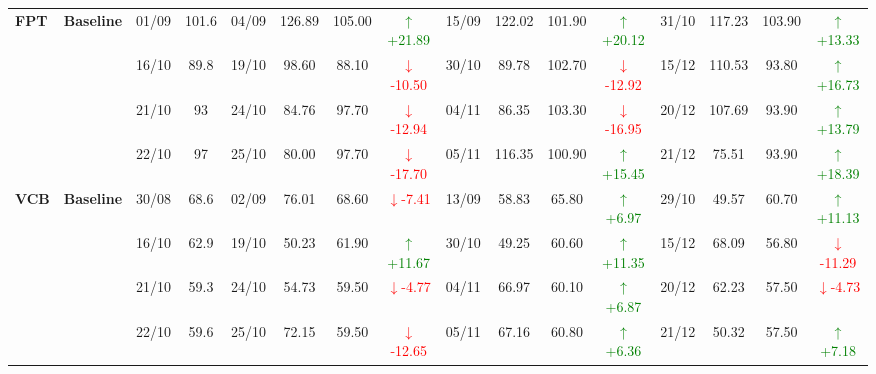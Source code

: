 {\begin{longtable}{llcc|cccc|cccc|cccc}
\multirow{4}{*}{\textbf{FPT}}
& \textbf{Baseline}
& 01/09 & 101.6 & 04/09 & 126.89 & 105.00 & \textcolor{green}{\(\uparrow\)+21.89} & 15/09 & 122.02 & 101.90 & \textcolor{green}{\(\uparrow\)+20.12} & 31/10 & 117.23 & 103.90 & \textcolor{green}{\(\uparrow\)+13.33} \\
& & 16/10 & 89.8 & 19/10 & 98.60 & 88.10 & \textcolor{red}{\(\downarrow\)-10.50} & 30/10 & 89.78 & 102.70 & \textcolor{red}{\(\downarrow\)-12.92} & 15/12 & 110.53 & 93.80 & \textcolor{green}{\(\uparrow\)+16.73} \\
& & 21/10 & 93 & 24/10 & 84.76 & 97.70 & \textcolor{red}{\(\downarrow\)-12.94} & 04/11 & 86.35 & 103.30 & \textcolor{red}{\(\downarrow\)-16.95} & 20/12 & 107.69 & 93.90 & \textcolor{green}{\(\uparrow\)+13.79} \\
& & 22/10 & 97 & 25/10 & 80.00 & 97.70 & \textcolor{red}{\(\downarrow\)-17.70} & 05/11 & 116.35 & 100.90 & \textcolor{green}{\(\uparrow\)+15.45} & 21/12 & 75.51 & 93.90 & \textcolor{green}{\(\uparrow\)+18.39} \\
\midrule

\multirow{4}{*}{\textbf{VCB}}
& \textbf{Baseline}
& 30/08 & 68.6 & 02/09 & 76.01 & 68.60 & \textcolor{red}{\(\downarrow\)-7.41} & 13/09 & 58.83 & 65.80 & \textcolor{green}{\(\uparrow\)+6.97} & 29/10 & 49.57 & 60.70 & \textcolor{green}{\(\uparrow\)+11.13} \\
& & 16/10 & 62.9 & 19/10 & 50.23 & 61.90 & \textcolor{green}{\(\uparrow\)+11.67} & 30/10 & 49.25 & 60.60 & \textcolor{green}{\(\uparrow\)+11.35} & 15/12 & 68.09 & 56.80 & \textcolor{red}{\(\downarrow\)-11.29} \\
& & 21/10 & 59.3 & 24/10 & 54.73 & 59.50 & \textcolor{red}{\(\downarrow\)-4.77} & 04/11 & 66.97 & 60.10 & \textcolor{green}{\(\uparrow\)+6.87} & 20/12 & 62.23 & 57.50 & \textcolor{red}{\(\downarrow\)-4.73} \\
& & 22/10 & 59.6 & 25/10 & 72.15 & 59.50 & \textcolor{red}{\(\downarrow\)-12.65} & 05/11 & 67.16 & 60.80 & \textcolor{green}{\(\uparrow\)+6.36} & 21/12 & 50.32 & 57.50 & \textcolor{green}{\(\uparrow\)+7.18} \\
\midrule


\end{longtable}}
